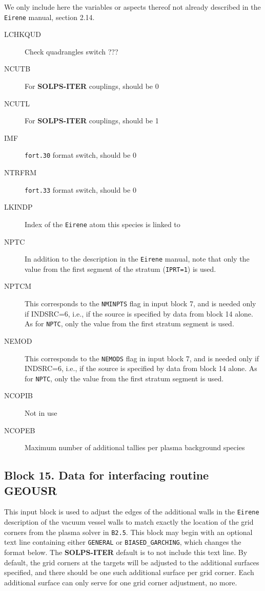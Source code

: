 \documentclass[a4paper,10pt]{report}
\newcommand\SOLPSITER{{\bf SOLPS-ITER} }
\begin{document}
We only include here the variables or aspects thereof not already described in the {\tt Eirene} manual, section 2.14.

\begin{description}
  \item[LCHKQUD] Check quadrangles switch ???
  \item[NCUTB] For \SOLPSITER couplings, should be 0
  \item[NCUTL] For \SOLPSITER couplings, should be 1
  \item[IMF] {\tt fort.30} format switch, should be 0
  \item[NTRFRM] {\tt fort.33} format switch, should be 0
  \item[LKINDP] Index of the {\tt Eirene} atom this species is linked to
  \item[NPTC] In addition to the description in the {\tt Eirene} manual, note that only the value from the first segment of the stratum ({\tt IPRT=1}) is used.
  \item[NPTCM] This corresponds to the {\tt NMINPTS} flag in input block 7, and is needed only if INDSRC=6, i.e., if the source is specified by data from block 14 alone. As for {\tt NPTC}, only the value from the first stratum segment is used.
  \item[NEMOD] This corresponds to the {\tt NEMODS} flag in input block 7, and is needed only if INDSRC=6, i.e., if the source is specified by data from block 14 alone. As for {\tt NPTC}, only the value from the first stratum segment is used.
  \item[NCOPIB] Not in use
  \item[NCOPEB] Maximum number of additional tallies per plasma background species
\end{description}

\subsection{Block 15. Data for interfacing routine GEOUSR}

This input block is used to adjust the edges of the additional walls in the {\tt Eirene} description of the vacuum vessel walls to match exactly the location of the grid corners from the plasma solver in {\tt B2.5}. This block may begin with an optional text line containing either {\tt GENERAL} or {\tt BIASED\_GARCHING}, which changes the format below. The \SOLPSITER default is to not include this text line. By default, the grid corners at the targets will be adjusted to the additional surfaces specified, and there should be one such additional surface per grid corner. Each additional surface can only serve for one grid corner adjustment, no more.
\end{document}
